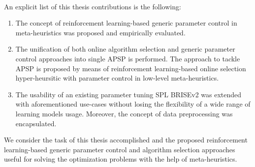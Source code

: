 \paragraph{}
An explicit list of this thesis contributions is the following:
\begin{enumerate}
	\item The concept of reinforcement learning-based generic parameter control in meta-heuristics was proposed and empirically evaluated.%
	
	\item The unification of both online algorithm selection and generic parameter control approaches into single APSP is performed. The approach to tackle APSP is proposed by means of reinforcement learning-based online selection hyper-heursitic with parameter control in low-level meta-heuristics.

	\item The usability of an existing parameter tuning SPL BRISEv2 was extended with aforementioned use-cases without losing the flexibility of a wide range of learning models usage. Moreover, the concept of data preprocessing was encapsulated.
\end{enumerate}

We consider the task of this thesis accomplished and the proposed reinforcement learning-based generic parameter control and algorithm selection approaches useful for solving the optimization problems with the help of meta-heuristics.